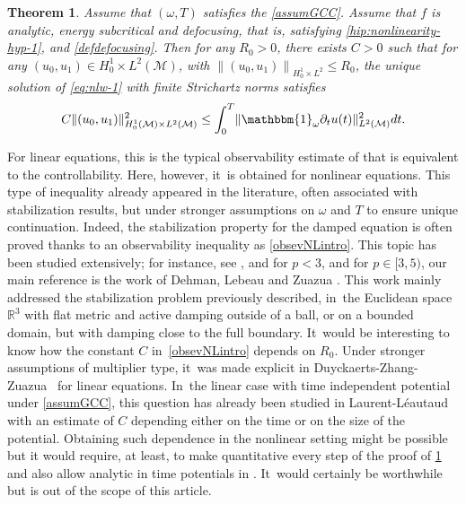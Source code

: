 \documentclass[JEP,XML,SOM,Unicode,published]{cedram}
\newtheorem{theorem}{Theorem}[section]
\theoremstyle{definition}
\let\mc\mathcal
\newcommand{\M}{\mc{M}}
\newcommand{\R}{\mathbb{R}}
\providecommand{\norm}[1]{\lVert#1\rVert}
\newcommand\nor[2]{\left\|#1\right\|_{#2}}
\begin{document}
\begin{theorem}
\label{thmobserintro}
Assume that $(\omega, T)$ satisfies the \ref{assumGCC}. Assume that $f$ is analytic, energy subcritical and defocusing, that is, satisfying \eqref{hip:nonlinearity-hyp-1}, and \eqref{defdefocusing}. Then for any $R_0\!>\!0$, there exists $C\!>\!0$ such that for any $(u_0,u_1)\!\in\! H^1_0\!\times\! L^2(\M)$, with $\nor{(u_0,u_1)}{H^1_0\times L^2}\leq R_0$, the unique solution of \eqref{eq:nlw-1} with finite Strichartz norms satisfies
\begin{align}\label{obsevNLintro}
C\norm{(u_0, u_1)}_{H_0^1(\M)\times L^2(\M)}^2\leq \int_0^T \norm{\mathbbm{1}_\omega\partial_t u(t)}_{L^2(\M)}^2 dt.
\end{align}
\end{theorem}
For linear equations, this is the typical observability estimate of \cite{BLR92} that is equivalent to the controllability. Here, however, it~is obtained for nonlinear equations. This type of inequality already appeared in the literature, often associated with stabilization results, but under stronger assumptions on $\omega$ and $T$ to ensure unique continuation. Indeed, the stabilization property for the damped equation is often proved thanks to an observability inequality as \eqref{obsevNLintro}. This topic has been studied extensively; for instance, see \cite{H:85}, \cite{Z:91} and \cite{D:01} for $p<3$, and for $p\in[3,5)$, our main reference is the work of Dehman, Lebeau and Zuazua \cite{DLZ03}. This work mainly addressed the stabilization problem previously described, in~the Euclidean space $\R^3$ with flat metric and active damping outside of a ball, or on a bounded domain, but with damping close to the full boundary. It~would be interesting to know how the constant $C$ in~\eqref{obsevNLintro} depends on $R_0$. Under stronger assumptions of multiplier type, it~was made explicit in Duyckaerts-Zhang-Zuazua~\cite{DZZ:08} for linear equations. In~the linear case with time independent potential under \ref{assumGCC}, this question has already been studied in Laurent-Léautaud~\cite{LL16} with an estimate of $C$ depending either on the time or on the size of the potential. Obtaining such dependence in the nonlinear setting might be possible but it would require, at least, to make quantitative every step of the proof of \cref{thmobserintro} and also allow analytic in time potentials in \cite{LL16}. It~would certainly be worthwhile but is out of the scope of this article.
\end{document}
